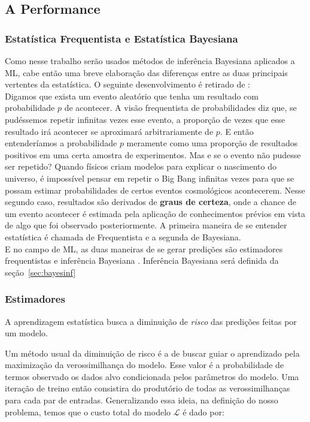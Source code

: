 \subsection{A Performance}
\label{sec:metricas}
\subsubsection{Estatística Frequentista e Estatística Bayesiana}
 
Como nesse trabalho serão usados métodos de inferência Bayesiana aplicados a ML,
cabe então uma breve elaboração das diferenças entre as duas principais
vertentes da estatística. O seguinte desenvolvimento é retirado de \cite{dlbook}:\\

Digamos que exista um evento aleatório que tenha um resultado com probabilidade
$p$ de acontecer. A visão frequentista de probabilidades diz que, se pudéssemos repetir infinitas vezes esse evento, a proporção de vezes que esse resultado irá acontecer se aproximará arbitrariamente de $p$. E então entenderíamos a probabilidade $p$ meramente como uma proporção de resultados positivos em uma certa amostra de experimentos. Mas e se o evento não pudesse ser repetido? Quando físicos criam modelos para explicar o nascimento do universo, é impossível pensar em repetir o Big Bang infinitas vezes para que se possam estimar probabilidades de certos eventos cosmológicos acontecerem. Nesse segundo caso, resultados são derivados de \textbf{graus de certeza}, onde a chance de um evento acontecer é estimada pela aplicação de conhecimentos prévios em vista de algo que foi observado posteriormente. A primeira maneira de se entender estatística é chamada de Frequentista e a segunda de Bayesiana. \\

E no campo de ML, as duas maneiras de se gerar predições são estimadores
frequentistas e inferência Bayesiana \citep{dlbook}. Inferência Bayesiana será
definida da seção~\ref{sec:bayesinf}


\subsubsection{Estimadores}


A aprendizagem estatística busca a diminuição de \textit{risco} das predições feitas por
um modelo.

Um método usual da diminuição de risco é a de buscar guiar o aprendizado pela
maximização da verossimilhança do modelo. Esse valor é a probabilidade de termos
observado os dados alvo condicionada pelos parâmetros do modelo. Uma iteração de
treino então consistira do produtório de todas as verossimilhanças para cada par
de entradas. Generalizando essa ideia, na definição do nosso problema, temos que o custo total do modelo
$\mathcal{L}$ é dado por:


